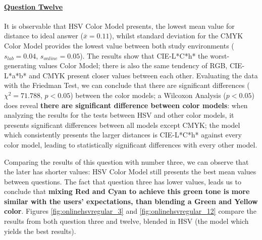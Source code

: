 \paragraph{\ul{Question Twelve}}
%
It is observable that HSV Color Model presents, the lowest mean value for distance to ideal answer ($\overline{x} = 0.11$), whilst standard deviation for the CMYK Color Model provides the lowest value between both study environments
($s_{lab} = 0.04$, $s_{online} = 0.05$).
The results show that CIE-L*C*h* the worst-generating values Color Model; there is also the same tendency of RGB, CIE-L*a*b* and CMYK present closer values between each other. Evaluating the data with the Friedman Test, we can conclude that there are significant differences ($\chi^2 = 71.788$, $p < 0.05$)
between the color models; a Wilcoxon Analysis ($p < 0.05$) does reveal \textbf{there are significant difference between color models}: when analyzing the results for the tests between HSV and other
color models, it presents significant differences between all models except CMYK; the model which consistently presents the larger distances is CIE-L*C*h* against every color model, leading to
statistically significant differences with every other model. \par
%
Comparing the results of this question with number three, we can observe that the later has shorter values: HSV Color Model still presents the best mean values between questions.
The fact that question three has lower values, leads us to conclude that \textbf{mixing Red and Cyan to achieve this green tone is more similar with the users' expectations, than blending a Green and
Yellow color}. Figures \ref{fig:onlinehsvregular_3} and \ref{fig:onlinehsvregular_12} compare the results from both question three and twelve, blended in HSV (the model which yields the best results).
%
